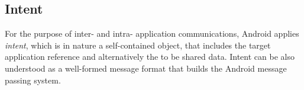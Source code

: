 \subsection{Intent} \label{secIntent}
For the purpose of inter- and intra- application communications, Android applies \emph{intent}, which is in nature a self-contained object, that includes the target application reference and alternatively the to be shared data.  Intent can be also understood as a well-formed message format that builds the Android message passing system\cite{android_secure_inter}.
